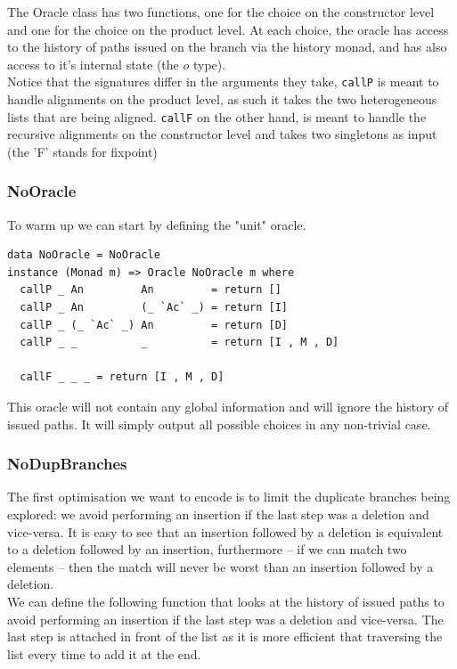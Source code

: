\documentclass[11pt, titlepage]{article}
\newcommand{\toHaskell}[1]{\texttt{#1}\xspace}
\begin{document}
The Oracle class has two functions, one for the choice on the constructor level and one for the choice on the product level. At each choice, the oracle has access to the history of paths issued on the branch via the history monad, and  has also access to it's internal state (the $o$ type).
\\
Notice that the signatures differ in the arguments they take, \toHaskell{callP} is meant to handle alignments on the product level, as such it takes the two heterogeneous lists that are being aligned. \toHaskell{callF} on the other hand, is meant to handle the recursive alignments on the constructor level and takes two singletons as input (the 'F' stands for fixpoint)
 
\subsubsection{NoOracle}
To warm up we can start by defining the "unit" oracle. 

\begin{verbatim}
data NoOracle = NoOracle
instance (Monad m) => Oracle NoOracle m where
  callP _ An         An         = return []
  callP _ An         (_ `Ac` _) = return [I]
  callP _ (_ `Ac` _) An         = return [D]
  callP _ _          _          = return [I , M , D]

  callF _ _ _ = return [I , M , D]
\end{verbatim}

This oracle will not contain any global information and will ignore the history of issued paths. It will simply output all possible choices in any non-trivial case.

\subsubsection{NoDupBranches}

The first optimisation we want to encode is to limit the duplicate branches being explored: we avoid performing an insertion if the last step was a deletion and vice-versa.
It is easy to see that an insertion followed by a deletion is equivalent to a deletion followed by an insertion, furthermore -- if we can match two elements -- then the match will never be worst than an insertion followed by a deletion.
\\
We can define the following function that looks at the history of issued paths to avoid performing an insertion if the last step was a deletion and vice-versa. The last step is attached in front of the list as it is more efficient that traversing the list every time to add it at the end.
\end{document}
